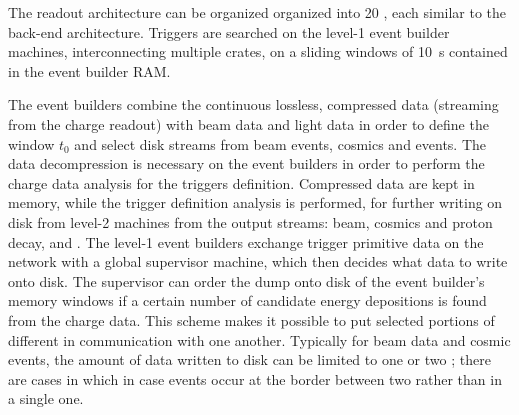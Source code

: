 
The \dual readout architecture can be organized organized into \num{20} , each similar to the  back-end architecture. Triggers are searched on the level-1 event builder machines, interconnecting multiple  crates, on a sliding windows of \SI{10}{s}  contained in the event builder RAM. %


The event builders combine the continuous lossless, compressed data (streaming from the charge readout) with beam data and light data in order to define the window $t_0$ and select disk streams from beam events, cosmics and  events. The data decompression is necessary on the event builders in order to perform the charge data analysis for the triggers definition. Compressed data are kept in memory, while the trigger definition analysis is performed, for further writing on disk from level-2 machines from the output streams: beam, cosmics and proton decay, and . 
The level-1 event builders exchange trigger primitive data on the network with a global supervisor machine, which then decides what data to write onto disk.  The supervisor can order the dump onto disk of the event builder's memory  windows if a certain number of candidate energy depositions is found from the charge data. 
This scheme makes it possible to put selected portions of different  in communication with one another.  
Typically for beam data and cosmic events, the amount of data written to disk can be limited to one or two ; there are cases in which in case events occur at the border between two  rather than in a single one.


